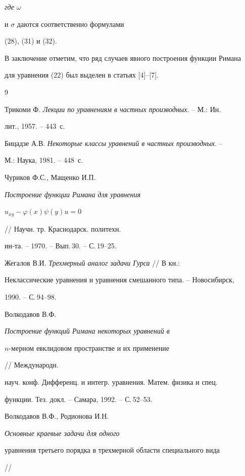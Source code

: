 {\it где $\omega$


и $\sigma$ даются соответственно формулами} (28), (31) и (32).





В заключение отметим, что ряд случаев явного построения функции Римана


для уравнения (22) был выделен в статьях [4]--[7].








\begin{thebibliography}{9}







Трикоми Ф. {\em Лекции по уравнениям в частных производных}. -- М.: Ин.


лит., 1957. -- 443~с.




Бицадзе А.В. {\em Некоторые классы уравнений в частных производных}. --


М.: Наука, 1981. -- 448~с.




Чуриков Ф.С., Мащенко И.П. {\em Построение функции Римана для уравнения


$u_{xy}-\varphi(x)\psi(y)u=0$} // Научн. тр. Краснодарск. политехн.


ин-та. -- 1970. -- Вып.\,30. -- С.\,19--25.




Жегалов В.И. {\em Трехмерный аналог задачи Гурса} // В кн.:


Неклассические уравнения и уравнения смешанного типа. -- Новосибирск,


1990. -- С.\,94--98.




Волкодавов В.Ф. {\em Построение функций Римана некоторых уравнений в


$n$-мерном евклидовом пространстве и их применение} // Международн.


науч. конф. Дифференц. и интегр. уравнения. Матем. физика и спец.


функции. Тез. докл. -- Самара, 1992. -- С.\,52--53.




Волкодавов В.Ф., Родионова И.Н. {\em Основные краевые задачи для одного


уравнения третьего порядка в трехмерной области специального вида} //



\end{thebibliography}
